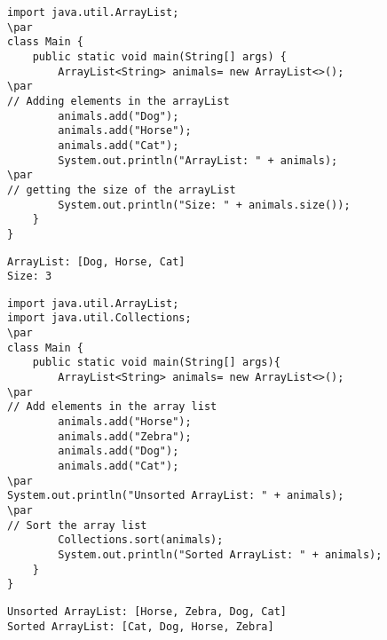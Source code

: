 \documentclass{book}
\def\lthtmlcheckvsize{\ifdim\ht\sizebox<\vsize 
  \ifdim\wd\sizebox<\hsize\expandafter\hfill\fi \expandafter\vfill
  \else\expandafter\vss\fi}%
\begin{document}
{\newpage\clearpage
{}%
\begin{lstlisting}
import java.util.ArrayList;
\par
class Main {
    public static void main(String[] args) {
        ArrayList<String> animals= new ArrayList<>();
\par
// Adding elements in the arrayList
        animals.add("Dog");
        animals.add("Horse");
        animals.add("Cat");
        System.out.println("ArrayList: " + animals);
\par
// getting the size of the arrayList
        System.out.println("Size: " + animals.size());
    }
}
\end{lstlisting}%
\lthtmlfigureZ
\lthtmlcheckvsize\clearpage}

{\newpage\clearpage
{}%
\begin{lstlisting}
ArrayList: [Dog, Horse, Cat]
Size: 3
\end{lstlisting}%
\lthtmlfigureZ
\lthtmlcheckvsize\clearpage}

{\newpage\clearpage
{}%
\begin{lstlisting}
import java.util.ArrayList;
import java.util.Collections;
\par
class Main {
    public static void main(String[] args){
        ArrayList<String> animals= new ArrayList<>();
\par
// Add elements in the array list
        animals.add("Horse");
        animals.add("Zebra");
        animals.add("Dog");
        animals.add("Cat");
\par
System.out.println("Unsorted ArrayList: " + animals);
\par
// Sort the array list
        Collections.sort(animals);
        System.out.println("Sorted ArrayList: " + animals);
    }
}
\end{lstlisting}%
\lthtmlfigureZ
\lthtmlcheckvsize\clearpage}

{\newpage\clearpage
{}%
\begin{lstlisting}
Unsorted ArrayList: [Horse, Zebra, Dog, Cat]
Sorted ArrayList: [Cat, Dog, Horse, Zebra]
\end{lstlisting}%
\lthtmlfigureZ
\lthtmlcheckvsize\clearpage}
\end{document}
